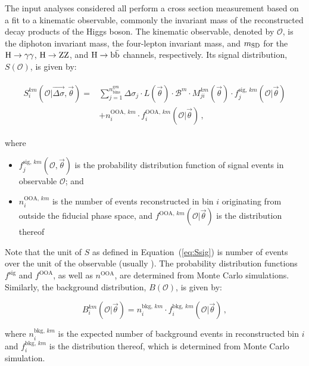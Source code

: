 The input analyses considered all perform a cross section measurement based on a fit to a kinematic observable, commonly the invariant mass of the reconstructed decay products of the Higgs boson.
% 
The kinematic observable, denoted by $\mathcal{O}$, is the diphoton invariant mass, the four-lepton invariant mass, and $m_\mathrm{SD}$ for the $\mathrm{H}\to\mathrm{\gamma}\mathrm{\gamma}$, $\mathrm{H}\to\mathrm{Z}\mathrm{Z}$, and $\mathrm{H}\to\mathrm{b}\bar{\mathrm{b}}$ channels, respectively.
% 
Its signal distribution, $S(\mathcal{O})$, is given by:
% 
\begin{linenomath*}
\begin{align}
\begin{split}
S^{km}_{i}( \mathcal{O} | \vec{\Delta\sigma}, \vec{\theta})
= &
    \sum_{j=1}^{n_\text{bins}^\text{gen}}
        \Delta\sigma_j \cdot L(\vec{\theta}) \cdot \mathcal{B}^{m}
        \cdot M_{ji}^{km}(\vec{\theta})
        \cdot f_{j}^{\text{sig},\,km}( \mathcal{O} | \vec{\theta} )
    \\ &
    + n^{\text{OOA},\,km}_i
        \cdot f^{\text{OOA},\,km}_i( \mathcal{O} | \vec{\theta} )
\,,
%
\label{eq:Ssig}
\end{split}
\end{align}
\end{linenomath*}
% 
where
% 
\begin{itemize}
% 
\item $f_{j}^{\text{sig},\,km}(\mathcal{O},\vec{\theta})$ is the probability distribution function of signal events in observable $\mathcal{O}$; and
% 
\item $n^{\text{OOA},\,km}_i$ is the number of events reconstructed in bin $i$ originating from outside the fiducial phase space, and $f^{\text{OOA},\,km}( \mathcal{O} | \vec{\theta} )$ is the distribution thereof
% 
\end{itemize}
% 
Note that the unit of $S$ as defined in Equation~(\ref{eq:Ssig}) is number of events over the unit of the observable (usually \GeV).
% 
The probability distribution functions $f^\text{sig}$ and $f^\text{OOA}$, as well as $n^\text{OOA}$, are determined from Monte Carlo simulations.
% 
Similarly, the background distribution, $B(\mathcal{O})$, is given by:
% 
\begin{linenomath*}
\begin{equation}
B^{km}_i(\mathcal{O}|\vec{\theta})
= n^{\text{bkg},\,km}_i
    \cdot f^{\text{bkg},\,km}_i(\mathcal{O}|\vec{\theta})
\,,
\end{equation}
\end{linenomath*}
% 
where $n^{\text{bkg},\,km}_i$ is the expected number of background events in reconstructed bin $i$ and $f^{\text{bkg},\,km}_i$ is the distribution thereof, which is determined from Monte Carlo simulation.
